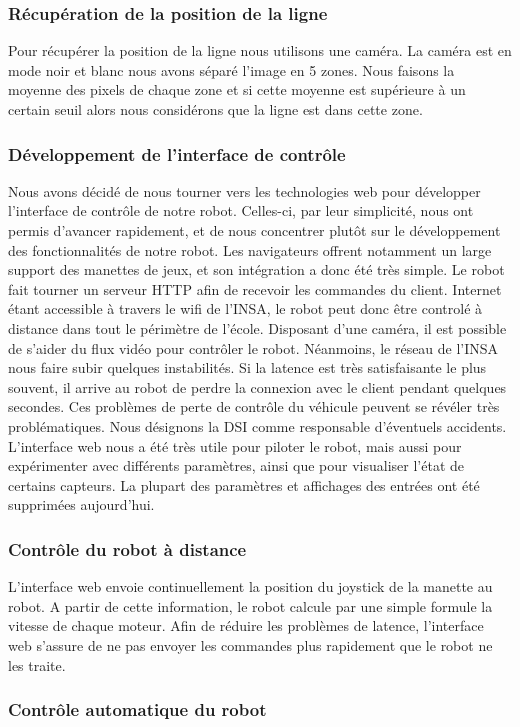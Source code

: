\subsubsection*{Récupération de la position de la ligne}
Pour récupérer la position de la ligne nous utilisons une caméra. La caméra est en mode noir et blanc nous avons séparé l'image en 5 zones.
Nous faisons la moyenne des pixels de chaque zone et si cette moyenne est supérieure à un certain seuil alors nous considérons que la ligne est dans cette zone.



\subsubsection{Développement de l'interface de contrôle}
Nous avons décidé de nous tourner vers les technologies web pour développer l'interface de contrôle de notre robot. Celles-ci, par leur simplicité, nous ont permis d'avancer rapidement, et de nous concentrer plutôt sur le développement des fonctionnalités de notre robot. Les navigateurs offrent notamment un large support des manettes de jeux, et son intégration a donc été très simple.
Le robot fait tourner un serveur HTTP afin de recevoir les commandes du client. Internet étant accessible à travers le wifi de l'INSA, le robot peut donc être controlé à distance dans tout le périmètre de l'école. Disposant d'une caméra, il est possible de s'aider du flux vidéo pour contrôler le robot.
Néanmoins, le réseau de l'INSA nous faire subir quelques instabilités. Si la latence est très satisfaisante le plus souvent, il arrive au robot de perdre la connexion avec le client pendant quelques secondes. Ces problèmes de perte de contrôle du véhicule peuvent se révéler très problématiques. Nous désignons la DSI comme responsable d'éventuels accidents.
L'interface web nous a été très utile pour piloter le robot, mais aussi pour expérimenter avec différents paramètres, ainsi que pour visualiser l'état de certains capteurs. La plupart des paramètres et affichages des entrées ont été supprimées aujourd'hui.

\subsubsection*{Contrôle du robot à distance}
L'interface web envoie continuellement la position du joystick de la manette au robot. A partir de cette information, le robot calcule par une simple formule la vitesse de chaque moteur. Afin de réduire les problèmes de latence, l'interface web s'assure de ne pas envoyer les commandes plus rapidement que le robot ne les traite.

\subsubsection*{Contrôle automatique du robot}
\todo